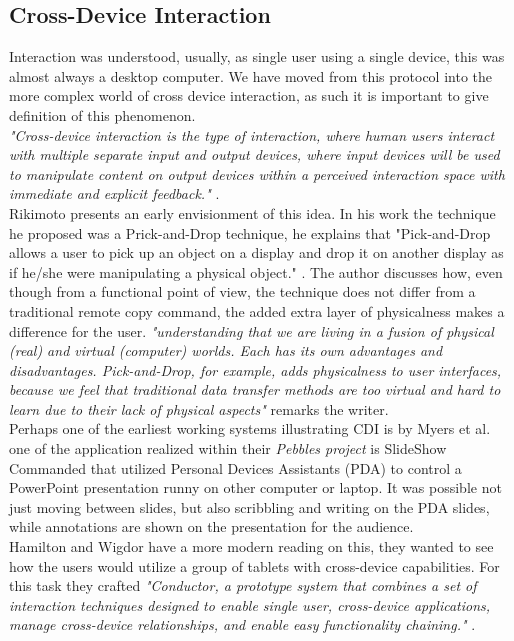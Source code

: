 \subsection{Cross-Device Interaction}

Interaction was understood, usually, as single user using a single device, this was almost always a desktop computer\cite{Levin:2014}. We have moved from this protocol into the more complex world of cross device interaction, as such it is important to give definition of this phenomenon.\\

\emph{"Cross-device interaction is the type of interaction, where human users interact with multiple separate input and output devices, where input devices will be used to manipulate content on output devices within a perceived interaction space with immediate and explicit feedback."} \cite{Scharf:2013}.\\

Rikimoto presents an early envisionment of this idea. In his work the technique he proposed was a Prick-and-Drop technique, he explains that "Pick-and-Drop allows a user to pick up an object on a display and drop it on another display as if he/she were manipulating a physical object." \cite{Rekimoto:1997}. The author discusses how, even though from a functional point of view, the technique does not differ from a traditional remote copy command, the added extra layer of physicalness makes a difference for the user. \emph{"understanding that we are living in a fusion of physical (real) and virtual (computer) worlds. Each has its own advantages and disadvantages. Pick-and-Drop, for example, adds physicalness to user interfaces, because we feel that traditional data transfer methods are too virtual and hard to learn due to their lack of physical aspects"} \cite{Rekimoto:1997} remarks the writer.\\
Perhaps one of the earliest working systems illustrating CDI is by Myers et al.
\cite{Myers:2001} one of the application realized within their \emph{Pebbles project} is SlideShow Commanded that utilized Personal Devices Assistants (PDA) to control a PowerPoint presentation runny on other computer or laptop.
It was possible not just moving between slides, but also scribbling and writing on the PDA slides, while annotations are shown on the presentation for the audience.\\

Hamilton and Wigdor have a more modern reading on this, they wanted to see how the users would utilize a group of tablets with cross-device capabilities. For this task they crafted\emph{ "Conductor, a prototype system that combines a set of interaction techniques designed to enable single user, cross-device applications, manage cross-device relationships, and enable easy functionality chaining."} \cite{Hamilton:2014}.\\

